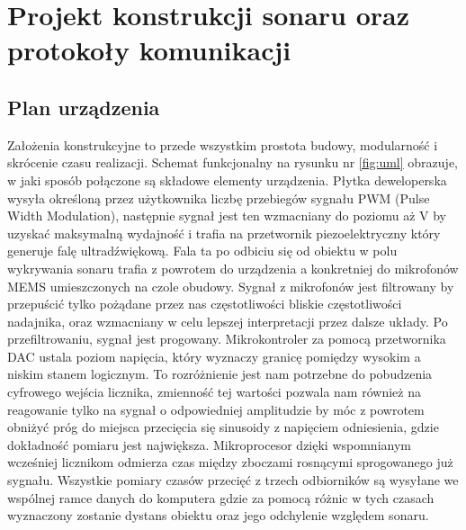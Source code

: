 \chapter[Projekt konstrukcji sonaru oraz protokoły komunikacji]{Projekt konstrukcji sonaru oraz protokoły komunikacji}

\label{chapter:konstrukcja}


\section{Plan urządzenia}
Założenia konstrukcyjne to przede wszystkim prostota budowy, modularność i skrócenie czasu realizacji. 
Schemat funkcjonalny na rysunku nr \ref{fig:uml} obrazuje, w jaki sposób połączone są składowe elementy urządzenia.
Płytka deweloperska wysyła określoną przez użytkownika liczbę przebiegów sygnału PWM (Pulse Width Modulation), 
następnie sygnał jest ten wzmacniany 
do poziomu aż \unit[80]{V} by uzyskać maksymalną wydajność i trafia na przetwornik piezoelektryczny który generuje falę ultradźwiękową.
Fala ta po odbiciu się od obiektu w polu wykrywania sonaru trafia z powrotem do urządzenia a konkretniej do mikrofonów MEMS umieszczonych na czole obudowy.
Sygnał z mikrofonów jest filtrowany by przepuścić tylko pożądane przez nas częstotliwości bliskie częstotliwości nadajnika, 
oraz wzmacniany w celu lepszej interpretacji przez dalsze układy.
Po przefiltrowaniu, sygnał jest progowany. Mikrokontroler za pomocą przetwornika DAC ustala poziom napięcia, 
który wyznaczy granicę pomiędzy wysokim a niskim stanem logicznym. To rozróżnienie jest nam potrzebne do pobudzenia cyfrowego wejścia licznika, 
zmienność tej wartości pozwala nam również na reagowanie tylko na sygnał o odpowiedniej amplitudzie by móc z powrotem obniżyć próg 
do miejsca przecięcia się sinusoidy z napięciem odniesienia, gdzie dokładność pomiaru jest największa.
Mikroprocesor dzięki wspomnianym wcześniej licznikom odmierza czas między zboczami rosnącymi sprogowanego już sygnału.
Wszystkie pomiary czasów przecięć z trzech odbiorników są wysyłane we wspólnej ramce danych do komputera gdzie za pomocą 
różnic w tych czasach wyznaczony zostanie dystans obiektu oraz jego odchylenie względem sonaru.

